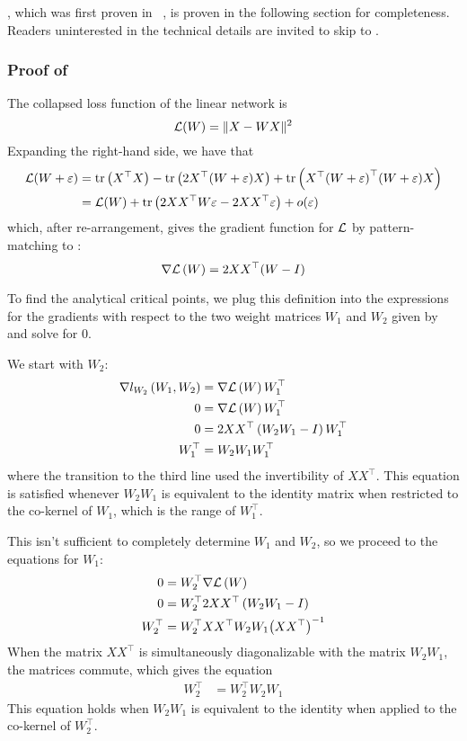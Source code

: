 \documentclass[../../thesis.tex]{subfiles}
\begin{document}
,
which was first proven in%
~\cite{baldi1989},
is proven in the following section
for completeness.
Readers uninterested in the technical details
are invited to skip to
.

\subsubsection{Proof of }%

The collapsed loss function of the linear network is
\begin{equation}
	{\mathcal{L}}(W) = \lVert X - WX\rVert^2
\end{equation}
\noindent Expanding the right-hand side,
we have that
\begin{align}
	{\mathcal{L}}(W + \varepsilon)
	&= \mathrm{tr}\left(X^\top X\right) - \mathrm{tr}\left(2X^\top(W+\varepsilon)X\right)
	+ \mathrm{tr}\left(X^\top{(W+\varepsilon)}^\top(W+\varepsilon)X\right)\\
	&= {\mathcal{L}}(W) + \mathrm{tr}\left(2 XX^\top W \varepsilon - 2XX^\top\varepsilon\right) + o(\varepsilon)
\end{align}
\noindent which, after re-arrangement, gives the gradient function
for ${\mathcal{L}}$ by pattern-matching to :
\begin{equation}
	\nabla{\mathcal{L}}\left(W\right) = 2 XX^\top (W - I)
\end{equation}

To find the analytical critical points,
we plug this definition into
the expressions for the gradients with respect to
the two weight matrices $W_1$ and $W_2$
given by 
and solve for 0.

We start with $W_2$:
\begin{align}
	\nabla l_{W_2}\left(W_1, W_2\right) &= \nabla{\mathcal{L}}\left(W\right) W_1^\top\\
	0 &= \nabla{\mathcal{L}}\left(W\right) W_1^\top\\
	0 &= 2 XX^\top\left(W_2 W_1 - I\right) W_1^\top\\
	W_1^\top &= W_2W_1 W_1^\top
\end{align}
\noindent where the transition to the third line
used the invertibility of $XX^\top$.
This equation is satisfied
whenever $W_2 W_1$ is equivalent to the identity
matrix when restricted to the co-kernel of $W_1$,
which is the range of $W_1^\top$.

This isn't sufficient to completely determine
$W_1$ and $W_2$,
so we proceed to the equations
for $W_1$:
\begin{align}
	0 &= W_2^\top\nabla{\mathcal{L}}\left(W\right)\\
	0 &= W_2^\top 2 XX^\top\left(W_2 W_1 - I\right)\\
	W_2^\top &= W_2^\top XX^\top W_2 W_1 {\left(X X^\top\right)}^{-1}
\end{align}
\noindent When the matrix $XX^\top$
is simultaneously diagonalizable with the matrix $W_2W_1$,
the matrices commute,
which gives the equation
\begin{align}
	W_2^\top &= W_2^\top W_2 W_1
\end{align}
\noindent
This equation holds when $W_2 W_1$ is equivalent to the identity
when applied to the co-kernel of $W_2^\top$.
\end{document}
